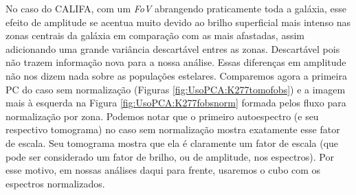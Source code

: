 No caso do CALIFA, com um {\em FoV} abrangendo praticamente toda a galáxia, esse efeito de amplitude se acentua muito
devido ao brilho superficial mais intenso nas zonas centrais da galáxia em comparação com as mais afastadas, assim
adicionando uma grande variância descartável entres as zonas. Descartável pois não trazem informação nova para a nossa
análise. Essas diferenças em amplitude não nos dizem nada sobre as populações estelares. Comparemos agora a primeira PC
do caso sem normalização (Figuras \ref{fig:UsoPCA:K277tomofobs}) e a imagem mais à esquerda na Figura
\ref{fig:UsoPCA:K277fobsnorm} formada pelos fluxo para normalização por zona. Podemos notar que o primeiro autoespectro
(e seu respectivo tomograma) no caso sem normalização mostra exatamente esse fator de escala. Seu tomograma mostra que
ela é claramente um fator de escala (que pode ser considerado um fator de brilho, ou de amplitude, nos espectros). Por
esse motivo, em nossas análises daqui para frente, usaremos o cubo com os espectros normalizados.

